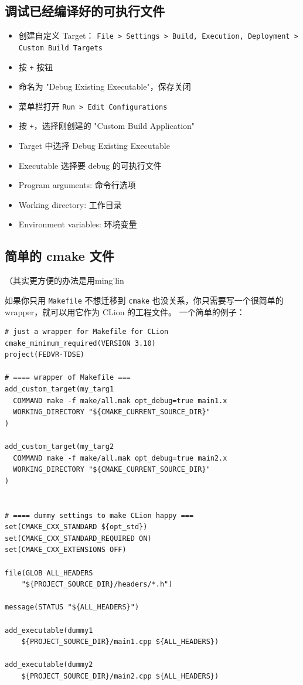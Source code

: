 \subsection{调试已经编译好的可执行文件}\label{sub_CLionN_1}
\begin{itemize}
\item 创建自定义 Target： \verb`File > Settings > Build, Execution, Deployment > Custom Build Targets`
\item 按 \verb`+` 按钮
\item 命名为 "Debug Existing Executable"，保存关闭
\item 菜单栏打开 \verb`Run > Edit Configurations`
\item 按 \verb`+`，选择刚创建的 "Custom Build Application"
\item Target 中选择 Debug Existing Executable
\item Executable 选择要 debug 的可执行文件
\item Program arguments: 命令行选项
\item Working directory: 工作目录
\item Environment variables: 环境变量
\end{itemize}

\subsection{简单的 cmake 文件}
（其实更方便的办法是用ming'lin

如果你只用 \verb`Makefile` 不想迁移到 \verb`cmake` 也没关系，你只需要写一个很简单的 wrapper，就可以用它作为 CLion 的工程文件。 一个简单的例子：
\begin{lstlisting}[language=none]
# just a wrapper for Makefile for CLion
cmake_minimum_required(VERSION 3.10)
project(FEDVR-TDSE)

# ==== wrapper of Makefile ===
add_custom_target(my_targ1
  COMMAND make -f make/all.mak opt_debug=true main1.x
  WORKING_DIRECTORY "${CMAKE_CURRENT_SOURCE_DIR}"
)

add_custom_target(my_targ2
  COMMAND make -f make/all.mak opt_debug=true main2.x
  WORKING_DIRECTORY "${CMAKE_CURRENT_SOURCE_DIR}"
)


# ==== dummy settings to make CLion happy ===
set(CMAKE_CXX_STANDARD ${opt_std})
set(CMAKE_CXX_STANDARD_REQUIRED ON)
set(CMAKE_CXX_EXTENSIONS OFF)

file(GLOB ALL_HEADERS
    "${PROJECT_SOURCE_DIR}/headers/*.h")

message(STATUS "${ALL_HEADERS}")

add_executable(dummy1
    ${PROJECT_SOURCE_DIR}/main1.cpp ${ALL_HEADERS})

add_executable(dummy2
    ${PROJECT_SOURCE_DIR}/main2.cpp ${ALL_HEADERS})
\end{lstlisting}

